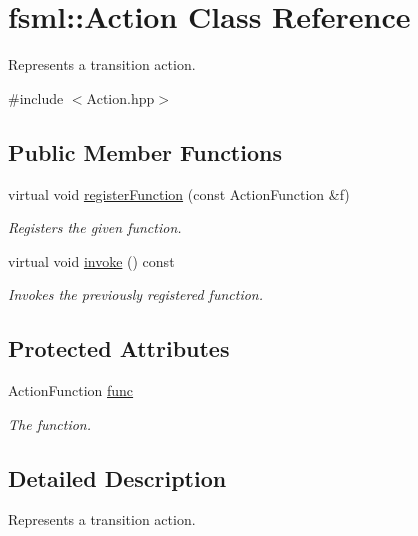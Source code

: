 \hypertarget{classfsml_1_1Action}{\section{fsml\-:\-:Action Class Reference}
\label{classfsml_1_1Action}
}


Represents a transition action.  




{\ttfamily \#include $<$Action.\-hpp$>$}

\subsection*{Public Member Functions}
\begin{DoxyCompactItemize}
\item 
virtual void \hyperlink{classfsml_1_1Action_ac41cfae7343d8b96fbd204451bee840f}{register\-Function} (const Action\-Function \&f)
\begin{DoxyCompactList}\small\item\em Registers the given function. \end{DoxyCompactList}\item 
virtual void \hyperlink{classfsml_1_1Action_ae5b8ae5409ea58bed119bc860a803897}{invoke} () const 
\begin{DoxyCompactList}\small\item\em Invokes the previously registered function. \end{DoxyCompactList}\end{DoxyCompactItemize}
\subsection*{Protected Attributes}
\begin{DoxyCompactItemize}
\item 
\hypertarget{classfsml_1_1Action_a40fbbd85f83fd1c0b5260584a24469ee}{Action\-Function \hyperlink{classfsml_1_1Action_a40fbbd85f83fd1c0b5260584a24469ee}{func}}\label{classfsml_1_1Action_a40fbbd85f83fd1c0b5260584a24469ee}

\begin{DoxyCompactList}\small\item\em The function. \end{DoxyCompactList}\end{DoxyCompactItemize}


\subsection{Detailed Description}
Represents a transition action. 



